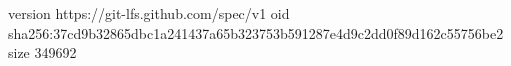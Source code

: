 version https://git-lfs.github.com/spec/v1
oid sha256:37cd9b32865dbc1a241437a65b323753b591287e4d9c2dd0f89d162c55756be2
size 349692
